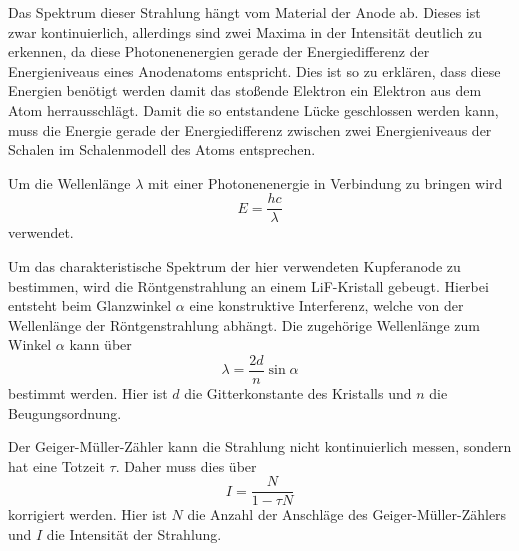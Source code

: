 Das Spektrum dieser Strahlung hängt vom Material der Anode ab.
Dieses ist zwar kontinuierlich, allerdings sind zwei Maxima in der Intensität deutlich zu erkennen, 
da diese Photonenenergien gerade der Energiedifferenz der Energieniveaus eines Anodenatoms entspricht.
Dies ist so zu erklären, dass diese Energien benötigt werden damit das stoßende Elektron ein Elektron aus dem Atom herrausschlägt.
Damit die so entstandene Lücke geschlossen werden kann, muss die Energie gerade der Energiedifferenz zwischen zwei Energieniveaus der Schalen im Schalenmodell des Atoms entsprechen.

Um die Wellenlänge $\lambda$ mit einer Photonenenergie in Verbindung zu bringen wird 
\begin{equation}
    E = \frac{h c}{\lambda}
    \label{eq:photonenenergie}
\end{equation} 
verwendet.

Um das charakteristische Spektrum der hier verwendeten Kupferanode zu bestimmen, wird die Röntgenstrahlung an einem LiF-Kristall gebeugt.
Hierbei entsteht beim Glanzwinkel $\alpha$ eine konstruktive Interferenz, welche von der Wellenlänge der Röntgenstrahlung abhängt. 
Die zugehörige Wellenlänge zum Winkel $\alpha$ kann über 
\begin{equation}
    \lambda = \frac{2d}{n}\sin\alpha
    \label{eq:glanzwinkel}
\end{equation}
bestimmt werden. 
Hier ist $d$ die Gitterkonstante des Kristalls und $n$ die Beugungsordnung.

Der Geiger-Müller-Zähler kann die Strahlung nicht kontinuierlich messen, sondern hat eine Totzeit $\tau$.
Daher muss dies über
\begin{equation}
    I = \frac{N}{1 - \tau N}
    \label{eq:totzeit}
\end{equation}
korrigiert werden. Hier ist $N$ die Anzahl der Anschläge des Geiger-Müller-Zählers und $I$ die Intensität der Strahlung.\cite{V603}